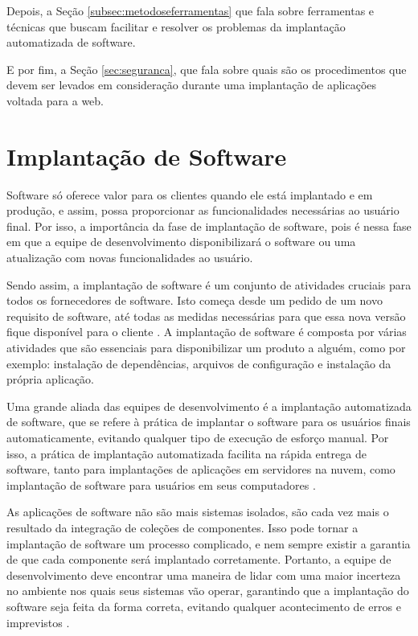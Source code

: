 Depois, a Seção \ref{subsec:metodoseferramentas} que fala sobre
ferramentas e técnicas que buscam facilitar e resolver os problemas da
implantação automatizada de software.

E por fim, a Seção \ref{sec:seguranca}, que fala sobre quais são os procedimentos 
que devem ser levados em consideração durante uma implantação de aplicações voltada
para a web.

\section{Implantação de Software}
\label{sec:implantacao}
Software só oferece valor para os clientes quando ele está implantado e em produção,
e assim, possa proporcionar as funcionalidades necessárias ao usuário final. Por
 isso, a importância da fase de implantação de software, pois é nessa fase em que a equipe
de desenvolvimento disponibilizará o software ou uma atualização com novas funcionalidades
ao usuário. 

Sendo assim, a implantação de software é um conjunto de atividades cruciais
para todos os fornecedores de software. Isto começa desde um pedido de um novo requisito
de software, até todas as medidas necessárias para que essa nova versão fique disponível
para o cliente \cite{5741269}. A implantação de software é composta por várias
atividades que são essenciais para disponibilizar um produto a alguém, como por exemplo:
instalação de dependências, arquivos de configuração e instalação da própria aplicação.

Uma grande aliada das equipes de desenvolvimento é a implantação automatizada de
software, que se refere à prática de implantar o software para os usuários finais
automaticamente, evitando qualquer tipo de execução de esforço manual. Por isso,
a prática de implantação automatizada facilita na rápida entrega de software, tanto
para implantações de aplicações em servidores na nuvem, como implantação de software
para usuários em seus computadores \cite{7284592}.

As aplicações de software não são mais sistemas isolados, 
são cada vez mais o resultado da integração de coleções de
componentes. Isso pode tornar a implantação de software um processo complicado, e
nem sempre existir a garantia de que cada componente será implantado corretamente.
Portanto, a equipe de desenvolvimento deve encontrar uma maneira de lidar
com uma maior incerteza no ambiente nos quais seus sistemas vão operar, garantindo
que a implantação do software seja feita da forma correta, evitando qualquer acontecimento
de erros e imprevistos \cite{deployment1998}.

